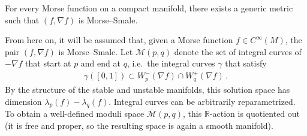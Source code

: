     \begin{property}
        For every Morse function on a compact manifold, there exists a generic metric such that $(f,\nabla f)$ is Morse--Smale.
    \end{property}

    From here on, it will be assumed that, given a Morse function $f\in C^\infty(M)$, the pair $(f,\nabla f)$ is Morse--Smale. Let $\mathcal{M}(p,q)$ denote the set of integral curves of $-\nabla f$ that start at $p$ and end at $q$, i.e.~the integral curves $\gamma$ that satisfy
    \begin{gather}
        \gamma([0,1])\subset W^-_p(\nabla f)\cap W^+_q(\nabla f)\,.
    \end{gather}
    By the structure of the stable and unstable manifolds, this solution space has dimension $\lambda_p(f)-\lambda_q(f)$. Integral curves can be arbitrarily reparametrized. To obtain a well-defined moduli space $\overline{\mathcal{M}}(p,q)$, this $\mathbb{R}$-action is quotiented out (it is free and proper, so the resulting space is again a smooth manifold).


